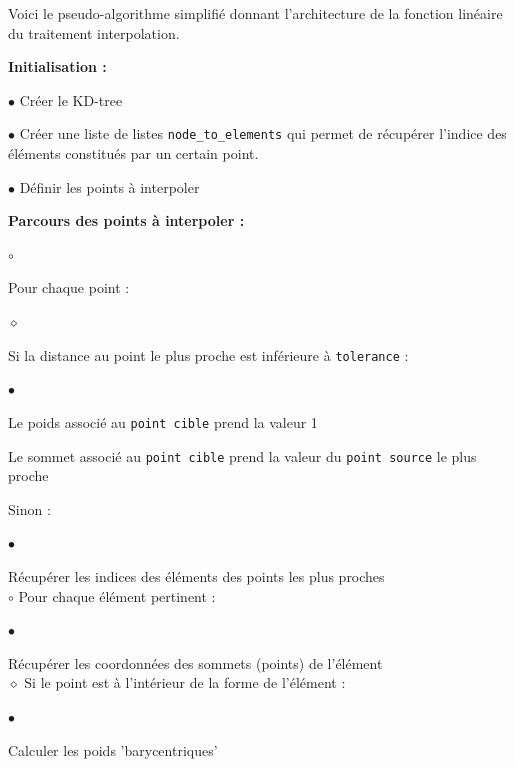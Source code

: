 Voici le pseudo-algorithme simplifié donnant l'architecture de la fonction linéaire du traitement interpolation.

\vspace{0.5cm}

\textbf{Initialisation :}

$\bullet$ Créer le KD-tree

$\bullet$ Créer une liste de listes \texttt{node\_to\_elements} qui permet de récupérer l'indice des éléments constitués par un certain point.

$\bullet$ Définir les points à interpoler

\vspace{0.5cm}

\textbf{Parcours des points à interpoler :}
\begin{list}{$\circ$}{\leftmargin=0.5cm  \itemsep=0cm}
    \item Pour chaque point :
    \begin{list}{$\diamond$}{\leftmargin=0.5cm  \itemsep=0cm}
        \item Si la distance au point le plus proche est inférieure à \texttt{tolerance} :
        \begin{list}{$\bullet$}{\leftmargin=0.5cm \itemsep=0cm}
            \item Le poids associé au \texttt{point cible} prend la valeur 1
            \item Le sommet associé au \texttt{point cible} prend la valeur du \texttt{point source} le plus proche
        \end{list}
        \item Sinon :
        \begin{list}{$\bullet$}{\leftmargin=0.5cm  \itemsep=0cm}
            \item Récupérer les indices des éléments des points les plus proches\\
            $\circ$ Pour chaque élément pertinent :
            \begin{list}{$\bullet$}{\leftmargin=0.5cm \itemsep=0cm}
                \item Récupérer les coordonnées des sommets (points) de l'élément\\
                $\diamond$ Si le point est à l'intérieur de la forme de l'élément :
                \begin{list}{$\bullet$}{\leftmargin=0.5cm  \itemsep=0cm}
                    \item Calculer les poids 'barycentriques'

\end{list}
\end{list}
\end{list}
\end{list}
\end{list}
